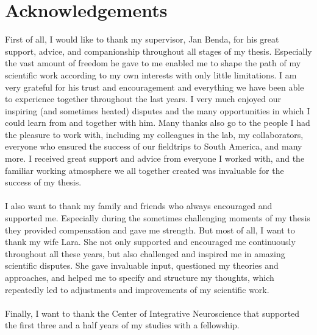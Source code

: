 \documentclass[11pt,pdftex,]{book}
\newcommand{\figurecaptions}{\pagestyle{empty}\clearpage\processdelayedfloats\renewcommand{\figureplace}{}}}%
\newcommand{\figurecaptions}{}%
\begin{document}

%
\cleardoublepage
\chapter*{Acknowledgements}

First of all, I would like to thank my supervisor, Jan Benda, for his great support, advice, and companionship throughout all stages of my thesis. Especially the vast amount of freedom he gave to me enabled me to shape the path of my scientific work according to my own interests with only little limitations. I am very grateful for his trust and encouragement and everything we have been able to experience together throughout the last years. I very much enjoyed our inspiring (and sometimes heated) disputes and the many opportunities in which I could learn from and together with him. Many thanks also go to the people I had the pleasure to work with, including my colleagues in the lab, my collaborators, everyone who ensured the success of our fieldtrips to South America, and many more. I received great support and advice from everyone I worked with, and the familiar working atmosphere we all together created was invaluable for the success of my thesis.
\\\\I also want to thank my family and friends who always encouraged and supported me. Especially during the sometimes challenging moments of my thesis they provided compensation and gave me strength. But most of all, I want to thank my wife Lara. She not only supported and encouraged me continuously throughout all these years, but also challenged and inspired me in amazing scientific disputes. She gave invaluable input, questioned my theories and approaches, and helped me to specify and structure my thoughts, which repeatedly led to adjustments and improvements of my scientific work.
\\\\ Finally, I want to thank the Center of Integrative Neuroscience that supported the first three and a half years of my studies with a fellowship.


\cleardoublepage
{}
\setcounter{page}{1}
\graphicspath{{chapter_1_intro/figures/}}


\cleardoublepage
\graphicspath{{chapter_2_methods/figures/}}


\cleardoublepage
\graphicspath{{chapter_3_habitats/figures/}}


\cleardoublepage
\graphicspath{{chapter_4_competition/figures/}}


\cleardoublepage
\graphicspath{{chapter_5_discussion/}}

%

%
%
%
\cleardoublepage
\fancyhead[LE]{}
\thispagestyle{plain}

\figurecaptions
\end{document}
